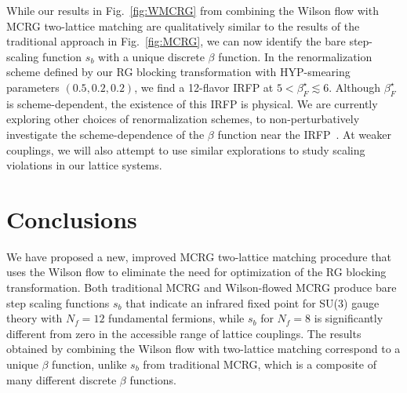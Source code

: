 \documentclass{PoS}
\newcommand{\be}{\ensuremath{\beta} }
\newcommand{\lsim}{\ensuremath{\lesssim} }
\newcommand{\fig}[1]{Fig.~\ref{#1}}
\begin{document}
While our results in \fig{fig:WMCRG} from combining the Wilson flow with MCRG two-lattice matching are qualitatively similar to the results of the traditional approach in \fig{fig:MCRG}, we can now identify the bare step-scaling function $s_b$ with a unique discrete \be function.
In the renormalization scheme defined by our RG blocking transformation with HYP-smearing parameters $(0.5, 0.2, 0.2)$, we find a 12-flavor IRFP at $5 < \be_F^{\star} \lsim 6$.
Although $\be_F^{\star}$ is scheme-dependent, the existence of this IRFP is physical.
We are currently exploring other choices of renormalization schemes, to non-perturbatively investigate the scheme-dependence of the \be function near the IRFP~\cite{Ryttov:2012nt}.
At weaker couplings, we will also attempt to use similar explorations to study scaling violations in our lattice systems.



\section{Conclusions} %
We have proposed a new, improved MCRG two-lattice matching procedure that uses the Wilson flow to eliminate the need for optimization of the RG blocking transformation.
Both traditional MCRG and Wilson-flowed MCRG produce bare step scaling functions $s_b$ that indicate an infrared fixed point for SU(3) gauge theory with $N_f = 12$ fundamental fermions, while $s_b$ for $N_f = 8$ is significantly different from zero in the accessible range of lattice couplings.
The results obtained by combining the Wilson flow with two-lattice matching correspond to a unique \be function, unlike $s_b$ from traditional MCRG, which is a composite of many different discrete \be functions.





\end{document}
